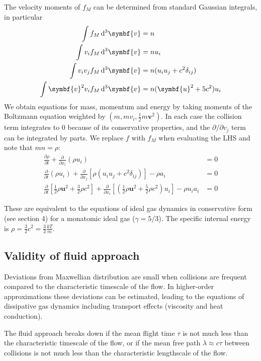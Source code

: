 \documentclass{jknotes}
\begin{document}
The velocity moments of $f_M$ can be determined from standard Gaussian
integrals, in particular
\begin{align}
	\int f_M \, \diffd^3 \symbf{v} &= n \\
	\int v_i f_M \, \diffd^3 \symbf{v} &= n u_i \\
	\int v_i v_j f_M \, \diffd^3 \symbf{v} &= n(u_i u_j + c^2 \delta_{ij}) \\
	\int \symbf{v}^2 v_i f_M \, \diffd^3 \symbf{v} &= n(\symbf{u}^2 + 5 c^2)
	u_i
\end{align}
We obtain equations for mass, momentum and energy by taking moments of the
Boltzmann equation weighted by $(m, mv_i, \frac{1}{2}m\symbf{v}^2)$. In each
case the collision term integrates to $0$ because of its conservative
properties, and the $\partial/\partial v_j$ term can be integrated by parts.
We replace $f$ with $f_M$ when evaluating the LHS and note that $mn = \rho$:
\begin{align}
	\frac{\partial \rho}{\partial t} + \frac{\partial}{\partial x_i} (\rho u_i) &= 0 \\
	\frac{\partial}{\partial t}(\rho u_i) + \frac{\partial}{\partial x_j}
	\left[ \rho (u_i u_j + c^2 \delta_{ij})\right] - \rho a_i &= 0 \\
	\frac{\partial}{\partial t} \left[\frac{1}{2}\rho \symbf{u}^2 + \frac{3}{2}\rho
	c^2\right] + 
	\frac{\partial}{\partial x_i} \left[ (\frac{1}{2}\rho \symbf{u}^2 +
	\frac{5}{2}\rho c^2) u_i\right] - \rho u_i a_i &= 0
\end{align}

These are equivalent to the equations of ideal gas dynamics in conservative
form (see section 4) for a monatomic ideal gas ($\gamma = 5/3$). The specific
internal energy is $\rho = \frac{3}{2}c^2 = \frac{3}{2}\frac{kT}{m}$.

\subsection{Validity of fluid approach}
Deviations from Maxwellian distribution are small when collisions are frequent
compared to the characteristic timescale of the flow. In higher-order
approximations these deviations can be estimated, leading to the equations of
dissipative gas dynamics including transport effects (viscosity and heat
conduction). 

The fluid approach breaks down if the mean flight time $\tau$ is
not much less than the characteristic timescale of the flow, or if the mean
free path $\lambda \approx c \tau$ between collisions is not much less than
the characteristic lengthscale of the flow.
\end{document}
